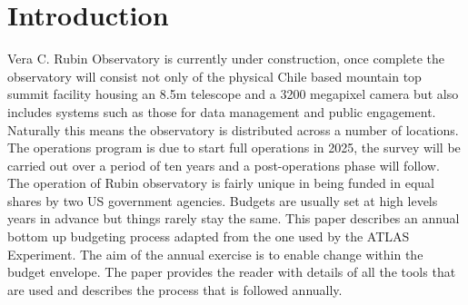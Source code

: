 \section{Introduction} \label{sec:intro}
\cite{2008arXiv0805.2366I}
Vera C. Rubin Observatory is currently under construction, once complete the observatory will consist not only of the  physical Chile based mountain top summit facility housing an 8.5m telescope and a 3200 megapixel camera but also includes systems such as those for data management and public engagement. Naturally this means the observatory is distributed across a number of locations. The operations program is due to start full operations in 2025, the survey will be carried out over a period of ten years and a post-operations phase will follow. The operation of Rubin observatory is fairly unique in being funded in equal shares by two US government agencies. Budgets are usually set at high levels years in advance but things rarely stay the same. This paper describes an annual bottom up budgeting process adapted from the one used by the ATLAS Experiment. The aim of the annual exercise is to enable change within the budget envelope.
The paper provides the reader with details of all the tools that are used and describes the process that is followed annually.
